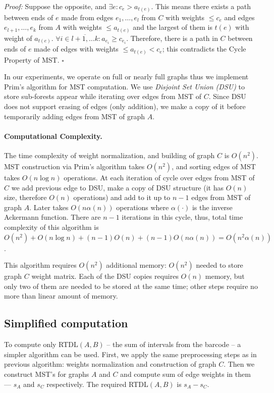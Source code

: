\documentclass[twoside]{article}
\begin{document}
\textit{Proof: } Suppose the opposite, and $\exists e: c_e > a_{t(e)}$. This means there exists a path between ends of $e$ made from edges $e_1, \ldots, e_l$ from $C$ with weights $\leq c_e$ and edges $e_{l+1}, \ldots, e_k$ from $A$ with weights $\leq a_{t(e)}$ and the largest of them is $t(e)$ with weight of $a_{t(e)}$. $\forall i \in \overline{l + 1, \ldots k}: a_{e_i} \geq c_{e_i}$. Therefore, there is a path in $C$ between ends of $e$ made of edges with weights $\leq a_{t(e)} < c_e$; this contradicts the Cycle Property of MST. 
\hfill$\square$

In our experiments, we operate on full or nearly full graphs thus we implement Prim's algorithm for MST computation. We use \textit{Disjoint Set Union (DSU)} to store sub-forests appear while iterating over edges from MST of $C$. Since DSU does not support erasing of edges (only addition), we make a copy of it before temporarily adding edges from MST of graph $A$.


\paragraph{Computational Complexity.}
The time complexity of weight normalization, and building of graph $C$ is $O(n^2)$. MST construction via Prim's algorithm takes $O(n^2)$, and sorting edges of MST takes $O(n\log n)$ operations. At each iteration of cycle over edges from MST of $C$ we add previous edge to DSU, make a copy of DSU structure (it has $O(n)$ size, therefore $O(n)$ operations) and add to it up to $n - 1$ edges from MST of graph $A$. Later takes $O(n\alpha(n))$ operations where $\alpha(\cdot)$ is the inverse Ackermann function. There are $n - 1$ iterations in this cycle, thus, total time complexity of this algorithm is $O(n^2) + O(n\log n) + (n - 1)O(n) + (n - 1)O(n\alpha(n)) = O(n^2\alpha(n))$.

This algorithm requires $O(n^2)$ additional memory: $O(n^2)$ needed to store graph $C$ weight matrix. Each of the DSU copies requires $O(n)$ memory, but only two of them are needed to be stored at the same time; other steps require no more than linear amount of memory.

\subsection{Simplified computation}

To compute only RTDL$(A, B)$ -- the sum of intervals from the barcode -- a simpler algorithm can be used. 
First, we apply the same preprocessing steps as in previous algorithm: weights normalization and construction of graph $C$. Then we construct MST's for graphs $A$ and $C$ and compute sum of edge weights in them --- $s_A$ and $s_C$ respectively. The required  RTDL$(A, B)$ is $s_A - s_C$.
\end{document}
